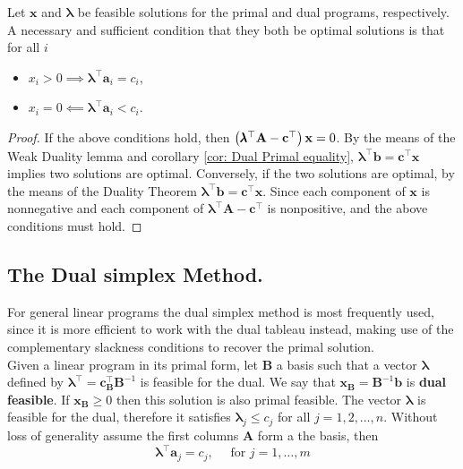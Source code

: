 \begin{theorem}
Let $\mathbf{x}$ and $\pmb{\lambda}$ be feasible solutions for the primal and dual programs, respectively. A necessary and sufficient condition that they both be optimal solutions is that for all $i$
\begin{itemize}
	\item $x_i>0 \implies \pmb{\lambda}^\top \mathbf{a}_i=c_i$,
	\item $x_i=0 \impliedby \pmb{\lambda}^\top \mathbf{a}_i<c_i$. 
\end{itemize}

\end{theorem}

\begin{proof}
If the above conditions hold, then $\left( \pmb{\lambda}^\top \mathbf{A}-\mathbf{c}^\top \right)\mathbf{x}=0$. By the means of the Weak Duality lemma and corollary \ref{cor: Dual Primal equality}, $\pmb{\lambda}^\top\mathbf b =\mathbf c ^ \top\mathbf x$ implies two solutions are optimal. Conversely, if the two solutions are optimal, by the means of the Duality Theorem $\pmb{\lambda}^\top \mathbf{b}= \mathbf{c}^\top \mathbf{x}$. Since each component of $\mathbf{x}$ is nonnegative and each component of  $\pmb{\lambda}^\top\mathbf{A}-\mathbf{c}^\top$ is nonpositive, and the above conditions must hold.
\end{proof}

\subsection{The Dual simplex Method.}
For general linear programs the dual simplex method is most frequently used, since it is more efficient to work with the dual tableau instead, making use of the complementary slackness conditions to recover the primal solution.\\

Given a linear program in its primal form, let $\mathbf{B}$ a basis such that a vector $\pmb{\lambda}$  defined by $\pmb\lambda^\top=\mathbf{c}_{\mathbf{B}}^\top\mathbf{B}^{-1}$ is feasible for the dual. We say that $\mathbf{x}_{\mathbf{B}}=\mathbf{B}^{-1}\mathbf{b}$ is \textbf{dual feasible}. If $\mathbf{x}_\mathbf{B}\geq 0$ then this solution is also primal feasible.  
The vector $\pmb\lambda$ is feasible for the dual, therefore it satisfies $\pmb\lambda_j\leq c_j$ for all $j=1, 2, \dots, n$. Without loss of generality assume the first columns $\mathbf{A}$ form a the basis, then
\begin{equation}
	\pmb{\lambda}^\top \mathbf{a}_j = c_j, \quad \text{ for } j=1, \dots, m
\end{equation}

